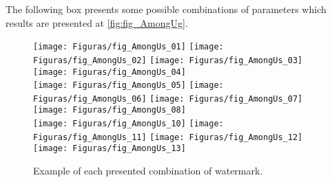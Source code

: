 \documentclass[12pt]{article}
\begin{document}
The following box presents some possible combinations of parameters which results are presented at \autoref{fig:fig_AmongUg}.
\begin{FHZtcbAmongUs}
\usepackage{tikz-among-us-watermark-eso-pic}
\usepackage[FG]{tikz-among-us-watermark-eso-pic}
\usepackage[type=0]{tikz-among-us-watermark-eso-pic}

\usepackage[cor=blue]{tikz-among-us-watermark-eso-pic}
\usepackage[cor=green,FG]{tikz-among-us-watermark-eso-pic}

\usepackage[BG]{tikz-among-us-watermark-eso-pic}
\usepackage[cor=green!80!black,BG]{tikz-among-us-watermark-eso-pic}
\usepackage[cor=orange,type=0]{tikz-among-us-watermark-eso-pic}

\usepackage[cor=yellow!80!black,FG,type=0]{tikz-among-us-watermark-eso-pic}
\usepackage[cor=orange,BG,type=0]{tikz-among-us-watermark-eso-pic}
\usepackage[BG,type=1]{tikz-among-us-watermark-eso-pic}

\usepackage[cor=pink,type=1]{tikz-among-us-watermark-eso-pic}
\usepackage[cor=teal,FG,type=1]{tikz-among-us-watermark-eso-pic}
\usepackage[cor=brown,BG,type=1]{tikz-among-us-watermark-eso-pic}
\end{FHZtcbAmongUs}

\begin{figure}[htb] %
  \texttt{[image: Figuras/fig\_AmongUs\_01]} \hfill
  \texttt{[image: Figuras/fig\_AmongUs\_02]} \hfill
  \texttt{[image: Figuras/fig\_AmongUs\_03]} \hfill
  \texttt{[image: Figuras/fig\_AmongUs\_04]} \\
  \texttt{[image: Figuras/fig\_AmongUs\_05]} \hfill
  \texttt{[image: Figuras/fig\_AmongUs\_06]} \hfill
  \texttt{[image: Figuras/fig\_AmongUs\_07]} \hfill
  \texttt{[image: Figuras/fig\_AmongUs\_08]} \\
  \texttt{[image: Figuras/fig\_AmongUs\_10]} \hfill
  \texttt{[image: Figuras/fig\_AmongUs\_11]} \hfill
  \texttt{[image: Figuras/fig\_AmongUs\_12]} \hfill
  \texttt{[image: Figuras/fig\_AmongUs\_13]}
  \caption{Example of each presented combination of watermark.}
  \label{fig:fig_AmongUg}
\end{figure}
\end{document}

